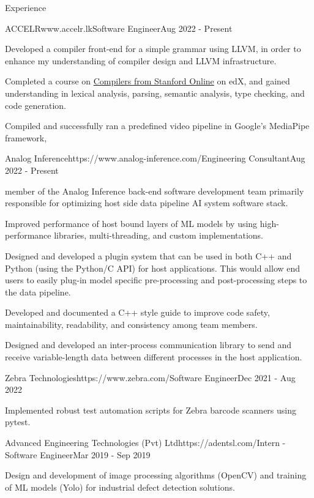 \documentclass[
	11pt, %
]{./assets/resume} %
\begin{document}
\begin{rSection}{Experience}

    \begin{rSubsectionX}{ACCELR}{www.accelr.lk}{Software Engineer}{Aug 2022 - Present}
		\item Developed a compiler front-end for a simple grammar using LLVM, in order to enhance my understanding of compiler design and LLVM infrastructure.
		\item Completed a course on \href{https://www.edx.org/learn/computer-science/stanford-university-compilers}{Compilers from Stanford Online} on edX, and gained understanding in lexical analysis, parsing, semantic analysis, type checking, and code generation.
		\item Compiled and successfully ran a predefined video pipeline in Google's MediaPipe framework,
	\end{rSubsectionX}

	\begin{rSubsectionX}{Analog Inference}{https://www.analog-inference.com/}{Engineering Consultant}{Aug 2022 - Present}
		\item member of the Analog Inference back-end software development team primarily responsible for optimizing host side data pipeline AI system software stack.
        \item Improved performance of host bound layers of ML models by using high-performance libraries, multi-threading, and custom implementations.
        \item Designed and developed a plugin system that can be used in both C++ and Python (using the Python/C API) for host applications. This would allow end users to easily plug-in model specific pre-processing and post-processing steps to the data pipeline.
        \item Developed and documented a C++ style guide to improve code safety, maintainability, readability, and consistency among team members. 
        \item Designed and developed an inter-process communication library to send and receive variable-length data between different processes in the host application.
	\end{rSubsectionX}

	\begin{rSubsectionX}{Zebra Technologies}{https://www.zebra.com/}{Software Engineer}{Dec 2021 - Aug 2022}
		\item Implemented robust test automation scripts for Zebra barcode scanners using pytest.
	\end{rSubsectionX}

	\begin{rSubsectionX}{Advanced Engineering Technologies (Pvt) Ltd}{https://adentsl.com/}{Intern - Software Engineer}{Mar 2019 - Sep 2019}
		\item Design and development of image processing algorithms (OpenCV) and training of ML models (Yolo) for industrial defect detection solutions.
	\end{rSubsectionX}
    
\end{rSection}
\end{document}

